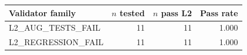 \begin{tabular}{lrrr}
\hline
Validator family & $n$ tested & $n$ pass L2 & Pass rate \\
\hline
L2\_AUG\_TESTS\_FAIL & 11 & 11 & 1.000 \\
L2\_REGRESSION\_FAIL & 11 & 11 & 1.000 \\
\hline
\end{tabular}
